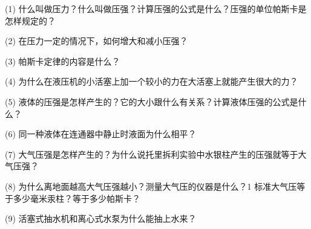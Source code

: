 \label{sec:5-fuxi}

(1) 什么叫做压力？什么叫做压强？计算压强的公式是什么？压强的单位帕斯卡是怎样规定的？

(2) 在压力一定的情况下，如何增大和减小压强？

(3) 帕斯卡定律的内容是什么？

(4) 为什么在液压机的小活塞上加一个较小的力在大活塞上就能产生很大的力？

(5) 液体的压强是怎样产生的？它的大小跟什么有关系？计算液体压强的公式是什么？

(6) 同一种液体在连通器中静止时液面为什么相平？

(7) 大气压强是怎样产生的？为什么说托里拆利实验中水银柱产生的压强就等于大气压强？

(8) 为什么离地面越高大气压强越小？测量大气压的仪器是什么？1 标准大气压等于多少毫米汞柱？等于多少帕斯卡？

(9) 活塞式抽水机和离心式水泵为什么能抽上水来？

